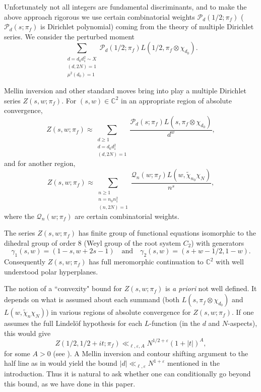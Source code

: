 \documentclass[12pt,reqno]{amsart}
\theoremstyle{plain}
\theoremstyle{remark}
\numberwithin{equation}{section}
\numberwithin{lemma}{section}
\numberwithin{theorem}{section}
\numberwithin{prop}{section}
\numberwithin{remark}{section}
\begin{document}
Unfortunately not all integers are fundamental discriminants, and to make the above approach rigorous 
we use certain 
combinatorial weights $\mathcal{P}_d(1/2;\pi_f)$ \cite{BFH,CG1,CG2,Di} ($\mathcal{P}_d(s;\pi_f)$
is Dirichlet polynomial) coming from the 
theory of multiple Dirichlet series. We
consider the perturbed moment 
\begin{equation*}
\sum_{\substack{d=d_0 d_1^2 \sim X \\ (d,2N)=1 \\ \mu^2(d_0)=1 }}
 \mathcal{P}_d(1/2;\pi_f)  L(1/2,\pi_f \otimes \chi_{d_0}).
\end{equation*}

Mellin inversion and other standard moves bring into play a multiple Dirichlet series
$Z(s,w;\pi_f)$. For $(s,w) \in \mathbb{C}^2$ 
in an appropriate region of absolute convergence,
\begin{equation*}
Z(s,w;\pi_f) \approx \sum_{\substack{ d \geq 1\\ d=d_0 d_1^2 \\ (d,2N)=1}} \frac{\mathcal{P}_d(s;\pi_f)  
L(s,\pi_f \otimes \chi_{d_0}) }{d^w},
\end{equation*}
and for another region,
\begin{equation*}
Z(s,w;\pi_f) \approx \sum_{\substack{ n \geq 1\\ n=n_0 n_1^2 \\ (n,2N)=1}} \frac{\mathcal{Q}_n(w;\pi_f)  
L(w,\widetilde{\chi}_{n_0} \chi_N)}{n^s},
\end{equation*}
where the $\mathcal{Q}_n(w;\pi_f)$ are certain combinatorial weights.

The series $Z(s,w;\pi_f)$ has finite group of functional equations
isomorphic to the dihedral group of order $8$ (Weyl group of the root system $C_2$)
with generators
\begin{equation*}
\gamma_1(s,w)=(1-s,w+2s-1) \quad \text{and} \quad \gamma_2(s,w)=(s+w-1/2,1-w).
\end{equation*}
Consequently $Z(s,w;\pi_f)$
has full meromorphic continuation to $\mathbb{C}^2$ with well
understood polar hyperplanes.

The notion of a ``convexity" bound for $Z(s,w;\pi_f)$ is \emph{a priori} not well defined. 
It depends on what is assumed about each summand (both $L(s,\pi_f \otimes \chi_{d_0})$
and $L(w,\widetilde{\chi}_n \chi_N)$)
in various regions of absolute convergence for $Z(s,w;\pi_f)$. If one assumes the full Lindel\"{o}f 
hypothesis for each $L$-function (in the $d$ and $N$-aspects), this would give  
\begin{equation*}
Z(1/2,1/2+i t;\pi_f) \ll_{\ell,\varepsilon,A}  N^{1/2+\varepsilon} (1+|t|)^{A},
\end{equation*}
for some $A>0$ (see \cite[Proposition~3.20]{HK}). 
A Mellin inversion and contour shifting argument to the half line as 
in \cite[Remark~4.2]{HK} would yield the bound 
$|d| \ll_{\ell,\varepsilon} N^{1+\varepsilon}$ mentioned in the introduction. Thus it is natural
to ask whether one can conditionally go beyond this bound, as we have done in this paper.
\end{document}
